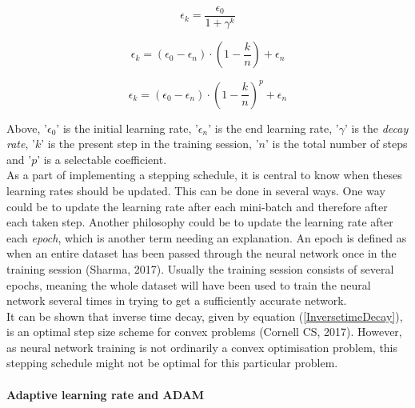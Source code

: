 \documentclass{article}
\begin{document}
\begin{equation}\label{InversetimeDecay}
    \epsilon_k = \frac{\epsilon_0}{1 + \gamma^k}
\end{equation}

\begin{equation}\label{PieceWiseConstant}
    \epsilon_k = (\epsilon_0 - \epsilon_n) \cdot
          (1 - \frac{k}{n})
          + \epsilon_n
\end{equation}

\begin{equation}\label{PolyomialDecay}
    \epsilon_k = (\epsilon_0 - \epsilon_n) \cdot
          (1 - \frac{k}{n}) ^ p
          + \epsilon_n
\end{equation}

\noindent Above, '$\epsilon_0$' is the initial learning rate, '$\epsilon_n$' is the end learning rate, '$\gamma$' is the \textit{decay rate}, '$k$' is the present step in the training session, '$n$' is the total number of steps and '$p$' is a selectable coefficient.\\

\noindent As a part of implementing a stepping schedule, it is central to know when theses learning rates should be updated. This can be done in several ways. One way could be to update the learning rate after each mini-batch and therefore after each taken step. Another philosophy could be to update the learning rate after each \textit{epoch}, which is another term needing an explanation. An epoch is defined as when an entire dataset has been passed through the neural network once in the training session (Sharma, 2017). Usually the training session consists of several epochs, meaning the whole dataset will have been used to train the neural network several times in trying to get a sufficiently accurate network.\\

\noindent It can be shown that inverse time decay, given by equation (\ref{InversetimeDecay}), is an optimal step size scheme for convex problems (Cornell CS, 2017). However, as neural network training is not ordinarily a convex optimisation problem, this stepping schedule might not be optimal for this particular problem.


\paragraph{Adaptive learning rate and ADAM}\label{adaptiveADAM}
\end{document}

